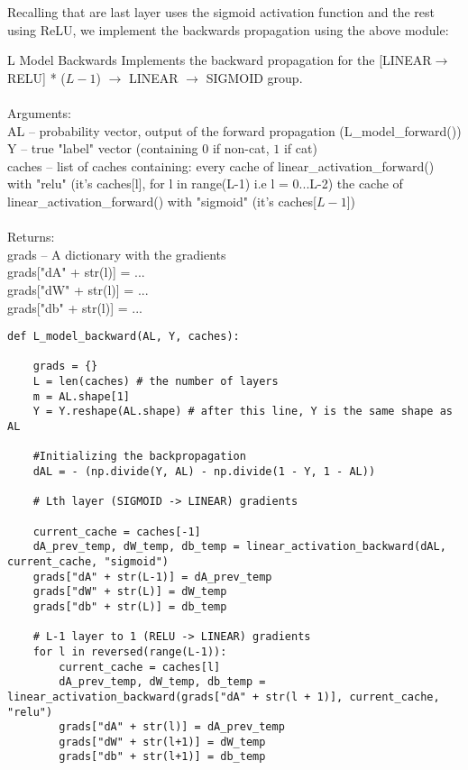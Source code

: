 \documentclass[a4paper]{article}
\begin{document}
\begin{enumerate}
Recalling that are last layer uses the sigmoid activation function and the rest using ReLU, we implement the backwards propagation using the above module: 

\begin{alg}{L Model Backwards}{} Implements the backward propagation for the [LINEAR$\to$RELU] * ($L-1$) $\to$ LINEAR $\to$ SIGMOID group. \\~\\
Arguments: \\
AL -- probability vector, output of the forward propagation (L\_model\_forward())\\
Y -- true "label" vector (containing $0$ if non-cat, $1$ if cat)\\
caches -- list of caches containing: every cache of linear\_activation\_forward() with "relu" (it's caches[l], for l in range(L-1) i.e l = 0...L-2) the cache of linear\_activation\_forward() with "sigmoid" (it's caches[$L-1$])\\~\\
Returns: \\
grads -- A dictionary with the gradients\\
grads["dA" + str(l)] = ... \\
grads["dW" + str(l)] = ...\\
grads["db" + str(l)] = ... \\
\begin{verbatim}
def L_model_backward(AL, Y, caches):

    grads = {}
    L = len(caches) # the number of layers
    m = AL.shape[1]
    Y = Y.reshape(AL.shape) # after this line, Y is the same shape as AL
    
    #Initializing the backpropagation
    dAL = - (np.divide(Y, AL) - np.divide(1 - Y, 1 - AL))
    
    # Lth layer (SIGMOID -> LINEAR) gradients

    current_cache = caches[-1]
    dA_prev_temp, dW_temp, db_temp = linear_activation_backward(dAL, current_cache, "sigmoid")
    grads["dA" + str(L-1)] = dA_prev_temp
    grads["dW" + str(L)] = dW_temp
    grads["db" + str(L)] = db_temp
    
    # L-1 layer to 1 (RELU -> LINEAR) gradients
    for l in reversed(range(L-1)):
        current_cache = caches[l]
        dA_prev_temp, dW_temp, db_temp = linear_activation_backward(grads["dA" + str(l + 1)], current_cache, "relu")
        grads["dA" + str(l)] = dA_prev_temp
        grads["dW" + str(l+1)] = dW_temp
        grads["db" + str(l+1)] = db_temp


\end{verbatim}
\end{alg}
\end{enumerate}
\end{document}
